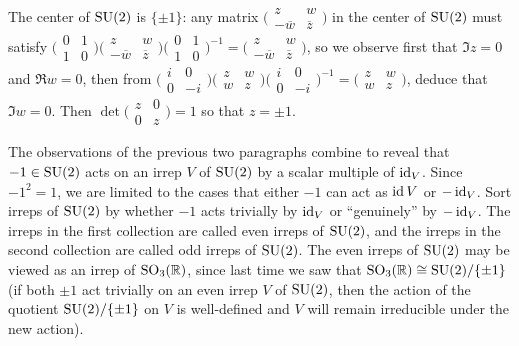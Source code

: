 \documentclass[../../rtnotes.tex]{subfiles}
\begin{document}
The center of $\operatorname{SU}(2)$ is $\{\pm 1\}$: any matrix $\bigl(\!\begin{smallmatrix}
	z & w \\ -\overline w & \overline z
\end{smallmatrix}\!\bigr)$ in the center of $\operatorname{SU}(2)$ must satisfy $\bigl(\!\begin{smallmatrix}
	0 & 1 \\ 1 & 0
\end{smallmatrix}\!\bigr)\bigl(\!\begin{smallmatrix}
	z & w \\ -\overline w & \overline z
\end{smallmatrix}\!\bigr)\bigl(\!\begin{smallmatrix}
	0 & 1 \\ 1 & 0
\end{smallmatrix}\!\bigr)^{-1} = \bigl(\!\begin{smallmatrix}
	z & w \\ -\overline w & \overline z
\end{smallmatrix}\!\bigr)$, so we observe first that $\Im z = 0$ and $\Re w  = 0$, then from $\bigl(\!\begin{smallmatrix}
	i & 0 \\ 0 & -i
\end{smallmatrix}\!\bigr)\bigl(\!\begin{smallmatrix}
	z & w \\ w & z
\end{smallmatrix}\!\bigr)\bigl(\!\begin{smallmatrix}
	i & 0 \\ 0 & -i
\end{smallmatrix}\!\bigr)^{-1} = \bigl(\!\begin{smallmatrix}
	z & w \\ w & z
\end{smallmatrix}\!\bigr)$, deduce that $\Im w = 0$. Then $\det \bigl(\!\begin{smallmatrix}
	z & 0 \\ 0 & z
\end{smallmatrix}\!\bigr) = 1$ so that $z = \pm 1$. 

The observations of the previous two paragraphs combine to reveal that $-1\in \operatorname{SU}(2)$ acts on an irrep $V$ of $\operatorname{SU}(2)$ by a scalar multiple of $\operatorname{id}_V$. Since $-1^2 = 1$, we are limited to the cases that either $-1$ can act as $\operatorname{id} V$ or $-\operatorname{id}_V$. Sort irreps of $\operatorname{SU}(2)$ by whether $-1$ acts trivially by $\operatorname{id}_V$ or ``genuinely'' by $-\operatorname{id}_V$. The irreps in the first collection are called even irreps of $\operatorname{SU}(2)$, and the irreps in the second collection are called odd irreps of $\operatorname{SU}(2)$. The even irreps of $\operatorname{SU}(2)$ may be viewed as an irrep of $\operatorname{SO}_3(\mathbb R)$, since last time we saw that $\operatorname{SO}_3(\mathbb R)\cong \operatorname{SU}(2)/\{\pm 1\}$ (if both $\pm 1$ act trivially on an even irrep $V$ of $\operatorname{SU}(2)$, then the action of the quotient $\operatorname{SU}(2)/\{\pm 1\}$ on $V$ is well-defined and $V$ will remain irreducible under the new action).
\end{document}
